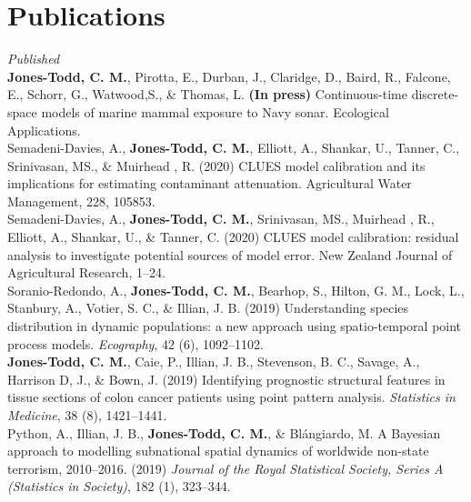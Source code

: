 \documentclass[10pt,a4paper]{moderncv}
\begin{document}
  \section{Publications}
  \vspace{5pt}

  \textit{\small{Published}}\\

   \textbf{Jones-Todd, C. M.}, Pirotta, E., Durban, J., Claridge, D., Baird, R., Falcone, E., Schorr, G., Watwood,S., \& Thomas, L.  \textbf{(In press)} Continuous-time discrete-space models of marine mammal exposure to Navy sonar. Ecological Applications.\\
 
   Semadeni-Davies, A., \textbf{Jones-Todd, C. M.},  Elliott, A., Shankar, U., Tanner, C., Srinivasan, MS., \& Muirhead , R. (2020) CLUES model calibration and its implications for estimating contaminant attenuation. Agricultural Water Management, 228, 105853.\\

    Semadeni-Davies, A., \textbf{Jones-Todd, C. M.}, Srinivasan, MS.,  Muirhead , R.,  Elliott, A., Shankar, U., \& Tanner, C. (2020) CLUES model calibration: residual analysis to investigate potential sources of model error. New Zealand Journal of Agricultural Research, 1--24.\\

Soranio-Redondo, A., \textbf{Jones-Todd, C. M.}, Bearhop, S., Hilton, G. M., Lock, L., Stanbury, A., Votier, S. C., \& Illian, J. B. (2019) Understanding species distribution in dynamic populations: a new approach using spatio-temporal point process models. \textit{Ecography}, 42 (6), 1092--1102.\\
  
\vspace{-3pt}
\textbf{Jones-Todd, C. M.}, Caie, P., Illian, J. B., Stevenson, B. C., Savage, A., Harrison D, J., \& Bown, J. (2019) Identifying prognostic structural features in tissue sections of colon cancer patients using point pattern analysis. \textit{Statistics in Medicine}, 38 (8), 1421--1441.\\

\vspace{-3pt}
Python, A.,  Illian, J. B., \textbf{Jones-Todd, C. M.}, \& Bl\'{a}ngiardo, M. A Bayesian approach to modelling subnational spatial dynamics of worldwide non-state terrorism, 2010--2016. (2019) \textit{Journal of the Royal Statistical Society, Series  A (Statistics in Society)}, 182 (1), 323--344.\\
\end{document}
